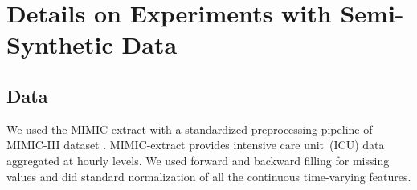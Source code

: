 \documentclass{article}
\theoremstyle{plain}
\theoremstyle{definition}
\theoremstyle{remark}
\begin{document}
\begin{table}[h!]
    \caption{Normalized RMSE for $\tau$-step-ahead prediction (here: random trajectories setting). Shown: mean and standard deviation over five runs (lower is better). Parameter $\gamma$ is the the amount of time-varying confounding: higher values mean larger treatment assignment bias.}
    \label{tab:tg-sim-tau-step-random}
    \begin{center}
        \begin{small}
        
        \end{small}
    \end{center}
    \vskip -0.1in
\end{table}

\begin{table}[h!]
    \caption{Normalized RMSE for $\tau$-step-ahead prediction (here: single sliding treatment setting). Shown: mean and standard deviation over five runs (lower is better). Parameter $\gamma$ is the the amount of time-varying confounding: higher values mean larger treatment assignment bias.}
    \label{tab:tg-sim-tau-step-timing}
    \begin{center}
        \begin{small}
        
        \end{small}
    \end{center}
    \vskip -0.1in
\end{table}

\clearpage
\section{Details on Experiments with Semi-Synthetic Data} \label{app:ss-sim}

\subsection{Data} 

We used the MIMIC-extract \cite{wang2020mimic} with a standardized preprocessing pipeline of MIMIC-III dataset \cite{johnson2016mimic}. MIMIC-extract provides intensive care unit~(ICU) data aggregated at hourly levels. We used forward and backward filling for missing values and did standard normalization of all the continuous time-varying features.
\end{document}

